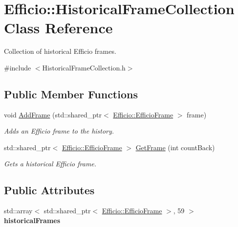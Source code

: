 \hypertarget{class_efficio_1_1_historical_frame_collection}{}\section{Efficio\+:\+:Historical\+Frame\+Collection Class Reference}
\label{class_efficio_1_1_historical_frame_collection}


Collection of historical Efficio frames.  




{\ttfamily \#include $<$Historical\+Frame\+Collection.\+h$>$}

\subsection*{Public Member Functions}
\begin{DoxyCompactItemize}
\item 
void \hyperlink{class_efficio_1_1_historical_frame_collection_a8bb93d37d7d634413626c52b5e8d1ea6}{Add\+Frame} (std\+::shared\+\_\+ptr$<$ \hyperlink{class_efficio_1_1_efficio_frame}{Efficio\+::\+Efficio\+Frame} $>$ frame)\hypertarget{class_efficio_1_1_historical_frame_collection_a8bb93d37d7d634413626c52b5e8d1ea6}{}\label{class_efficio_1_1_historical_frame_collection_a8bb93d37d7d634413626c52b5e8d1ea6}

\begin{DoxyCompactList}\small\item\em Adds an Efficio frame to the history. \end{DoxyCompactList}\item 
std\+::shared\+\_\+ptr$<$ \hyperlink{class_efficio_1_1_efficio_frame}{Efficio\+::\+Efficio\+Frame} $>$ \hyperlink{class_efficio_1_1_historical_frame_collection_abe5a246b4249f9596aae3cbcf04953b5}{Get\+Frame} (int count\+Back)\hypertarget{class_efficio_1_1_historical_frame_collection_abe5a246b4249f9596aae3cbcf04953b5}{}\label{class_efficio_1_1_historical_frame_collection_abe5a246b4249f9596aae3cbcf04953b5}

\begin{DoxyCompactList}\small\item\em Gets a historical Efficio frame. \end{DoxyCompactList}\end{DoxyCompactItemize}
\subsection*{Public Attributes}
\begin{DoxyCompactItemize}
\item 
std\+::array$<$ std\+::shared\+\_\+ptr$<$ \hyperlink{class_efficio_1_1_efficio_frame}{Efficio\+::\+Efficio\+Frame} $>$, 59 $>$ {\bfseries historical\+Frames}\hypertarget{class_efficio_1_1_historical_frame_collection_aad1e468b52ea498fd7393aad4022cc6c}{}\label{class_efficio_1_1_historical_frame_collection_aad1e468b52ea498fd7393aad4022cc6c}

\end{DoxyCompactItemize}


